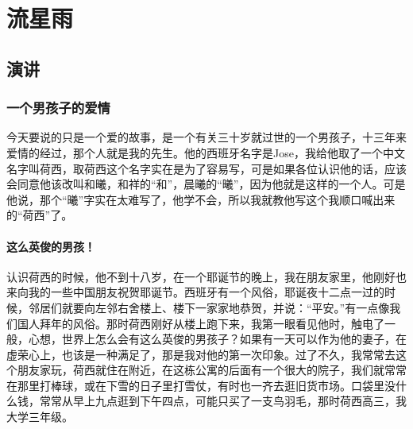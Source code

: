 
\section{流星雨}


\subsection{演讲}


\subsubsection{一个男孩子的爱情}


\par 今天要说的只是一个爱的故事，是一个有关三十岁就过世的一个男孩子，十三年来爱情的经过，那个人就是我的先生。他的西班牙名字是Jose，我给他取了一个中文名字叫荷西，取荷西这个名字实在是为了容易写，可是如果各位认识他的话，应该会同意他该改叫和曦，和祥的“和”，晨曦的“曦”，因为他就是这样的一个人。可是他说，那个“曦”字实在太难写了，他学不会，所以我就教他写这个我顺口喊出来的“荷西”了。
\paragraph{这么英俊的男孩！}
\par 认识荷西的时候，他不到十八岁，在一个耶诞节的晚上，我在朋友家里，他刚好也来向我的一些中国朋友祝贺耶诞节。西班牙有一个风俗，耶诞夜十二点一过的时候，邻居们就要向左邻右舍楼上、楼下一家家地恭贺，并说：“平安。”有一点像我们国人拜年的风俗。那时荷西刚好从楼上跑下来，我第一眼看见他时，触电了一般，心想，世界上怎么会有这么英俊的男孩子？如果有一天可以作为他的妻子，在虚荣心上，也该是一种满足了，那是我对他的第一次印象。过了不久，我常常去这个朋友家玩，荷西就住在附近，在这栋公寓的后面有一个很大的院子，我们就常常在那里打棒球，或在下雪的日子里打雪仗，有时也一齐去逛旧货市场。口袋里没什么钱，常常从早上九点逛到下午四点，可能只买了一支鸟羽毛，那时荷西高三，我大学三年级。
